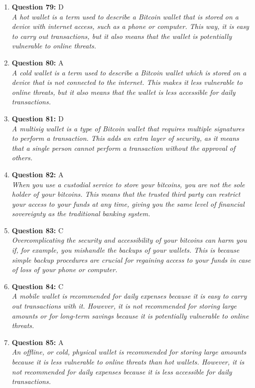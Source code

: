 \documentclass[12pt,a4paper]{article}
\begin{document}
\begin{enumerate}
\item \textbf{Question 79:} D
\\ \textit{A hot wallet is a term used to describe a Bitcoin wallet that is stored on a device with internet access, such as a phone or computer. This way, it is easy to carry out transactions, but it also means that the wallet is potentially vulnerable to online threats.}

\item \textbf{Question 80:} A
\\ \textit{A cold wallet is a term used to describe a Bitcoin wallet which is stored on a device that is not connected to the internet. This makes it less vulnerable to online threats, but it also means that the wallet is less accessible for daily transactions.}

\item \textbf{Question 81:} D
\\ \textit{A multisig wallet is a type of Bitcoin wallet that requires multiple signatures to perform a transaction. This adds an extra layer of security, as it means that a single person cannot perform a transaction without the approval of others.}

\item \textbf{Question 82:} A
\\ \textit{When you use a custodial service to store your bitcoins, you are not the sole holder of your bitcoins. This means that the trusted third party can restrict your access to your funds at any time, giving you the same level of financial sovereignty as the traditional banking system.}

\item \textbf{Question 83:} C
\\ \textit{Overcomplicating the security and accessibility of your bitcoins can harm you if, for example, you mishandle the backups of your wallets. This is because simple backup procedures are crucial for regaining access to your funds in case of loss of your phone or computer.}

\item \textbf{Question 84:} C
\\ \textit{A mobile wallet is recommended for daily expenses because it is easy to carry out transactions with it. However, it is not recommended for storing large amounts or for long-term savings because it is potentially vulnerable to online threats.}

\item \textbf{Question 85:} A
\\ \textit{An offline, or cold, physical wallet is recommended for storing large amounts because it is less vulnerable to online threats than hot wallets. However, it is not recommended for daily expenses because it is less accessible for daily transactions.}


\end{enumerate}
\end{document}
